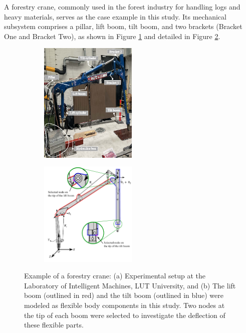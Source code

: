 A forestry crane, commonly used in the forest industry for handling logs and heavy materials, serves as the case example in this study. Its mechanical subsystem comprises a pillar, lift boom, tilt boom, and two brackets (Bracket One and Bracket Two), as shown in Figure \ref{fig01a} and detailed in Figure \ref{fig01b}. 


\begin{figure}[h]
    \begin{subfigure}{0.5\textwidth} 
        \centering
        \includegraphics[width=1.82in]{Fig2A.pdf}
        \caption{}
        \label{fig01a}
    \end{subfigure}%
    \hfill
    \begin{subfigure}{0.5\textwidth} 
        \centering
        \includegraphics[width=1.82in]{Fig2B.pdf}
        \caption{}
        \label{fig01b}
    \end{subfigure}
    \caption{Example of a forestry crane: (a) Experimental setup at the Laboratory of Intelligent Machines, LUT University, and (b) The lift boom (outlined in red) and the tilt boom (outlined in blue) were modeled as flexible body components in this study. Two nodes at the tip of each boom were selected to investigate the deflection of these flexible parts.}
    \label{Fig:SurrogateForestry}
\end{figure}



